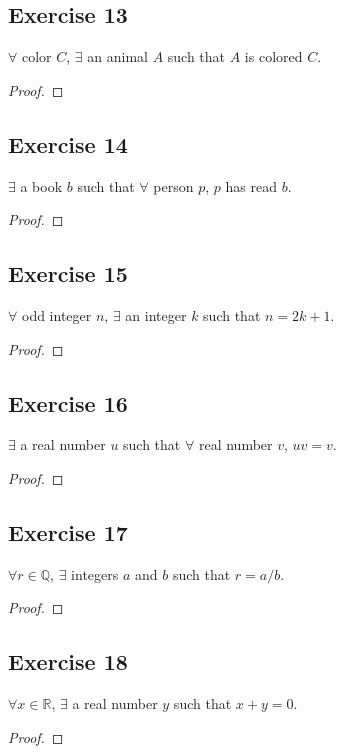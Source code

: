 \documentclass[14pt]{extarticle}
\newcommand{\R}{\mathbb{R}}
\newcommand{\Q}{\mathbb{Q}}
\newcommand{\fa}{\forall}
\newcommand{\te}{\exists}
\begin{document}
\subsection{Exercise 13}
$\fa$ color $C$, $\te$ an animal $A$ such that $A$ is colored $C$.

\begin{proof}

\end{proof}

\subsection{Exercise 14}
$\te$ a book $b$ such that $\fa$ person $p$, $p$ has read $b$.

\begin{proof}

\end{proof}

\subsection{Exercise 15}
$\fa$ odd integer $n$, $\te$ an integer $k$ such that $n = 2k + 1$.

\begin{proof}

\end{proof}

\subsection{Exercise 16}
$\te$ a real number $u$ such that $\fa$ real number $v$, $uv = v$.

\begin{proof}

\end{proof}

\subsection{Exercise 17}
$\fa r \in \Q$, $\te$ integers $a$ and $b$ such that $r = a/b$.

\begin{proof}

\end{proof}

\subsection{Exercise 18}
$\fa x \in \R$, $\te$ a real number $y$ such that $x + y = 0$.
\begin{proof}

\end{proof}
\end{document}
